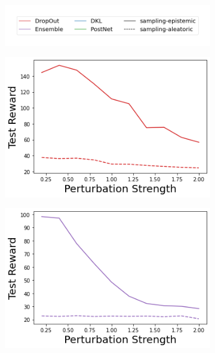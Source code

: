 \begin{figure}
    \centering
        \vspace{-6mm}
    \begin{subfigure}{.45\textwidth}
        \includegraphics[width=\textwidth]{sections/011_icml2022/resources/sampling-legend.png}
    \end{subfigure}
    \vspace{-3mm}
    
    \begin{subfigure}{.24\textwidth}
        \includegraphics[width=\textwidth]{sections/011_icml2022/resources/state_shift-DropOut-CartPoleShift-v0-mean_reward_.png}
    \end{subfigure}
    \begin{subfigure}{.24\textwidth}
        \includegraphics[width=\textwidth]{sections/011_icml2022/resources/state_shift-Ensemble-CartPoleShift-v0-mean_reward_.png}

\end{subfigure}
\end{figure}
